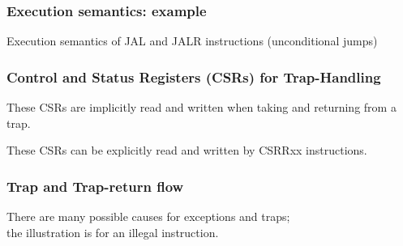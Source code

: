 
\begin{frame}
\frametitle{Execution semantics: example}

Execution semantics of JAL and JALR instructions (unconditional jumps)

\vspace{1ex}

\begin{center}
\end{center}

\end{frame}


\begin{frame}
\frametitle{Control and Status Registers (CSRs) for Trap-Handling}

\begin{center}
\end{center}

\vspace{1ex}

These CSRs are implicitly read and written when taking and returning from a trap.

These CSRs can be explicitly read and written by CSRRxx instructions.

\end{frame}


\begin{frame}
\frametitle{Trap and Trap-return flow}

\begin{center}
\end{center}

\vspace{1ex}

There are many possible causes for exceptions and traps; \\
the illustration is for an illegal instruction.

\end{frame}


